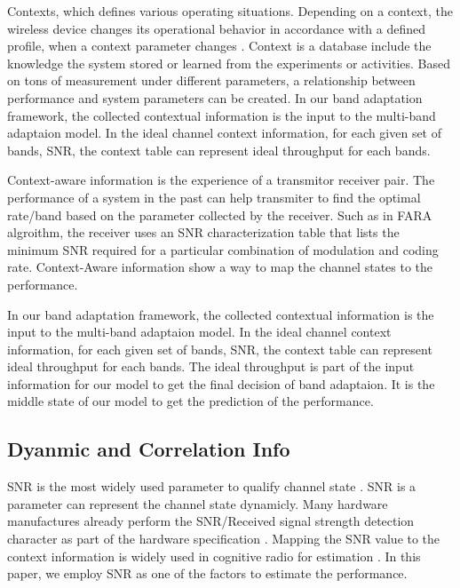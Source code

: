 

Contexts, which defines various operating situations. Depending on a context, the wireless device changes its operational 
behavior in accordance with a defined profile, when a context parameter changes \cite{phillips2004wireless}. Context is a database include the knowledge the system stored or learned from the experiments or activities. Based on tons of measurement under different parameters, a relationship between performance and system parameters can be created. In our band adaptation framework, the collected contextual information is the input to the multi-band adaptaion model. In the ideal channel context information, for each given set of bands, SNR, the context table can represent ideal throughput for each bands. 

Context-aware information is the experience of a transmitor receiver pair. The performance of a system in the past can help transmiter to find the optimal rate/band based on the parameter collected by the receiver. Such as in FARA algroithm, the receiver uses an SNR characterization table that lists the minimum SNR required for a particular combination of modulation and coding rate\cite{rahul2009frequency}. 
Context-Aware information show a way to map the channel states to the performance.

In our band adaptation framework, the collected contextual information is the input to the multi-band adaptaion model. In the ideal channel context information, for each given set of bands, SNR, the context table can represent ideal throughput for each bands. 
The ideal throughput is part of the input information for our model to get the final decision of band adaptaion.  It is the middle state of our model to get the prediction of the performance. 







\subsection{Dyanmic and Correlation Info}

SNR is the most widely used parameter to qualify channel state \cite{rahul2009frequency}. SNR is a parameter can represent the channel state dynamicly.
Many hardware manufactures already perform the SNR/Received signal strength detection character as part of the hardware specification \cite{edalat2006measured}. Mapping the SNR value to the context information is widely used in cognitive radio for estimation \cite{laneman2000energy,laneman2001efficient}. In this paper, we employ SNR as one of the factors to estimate the performance.

